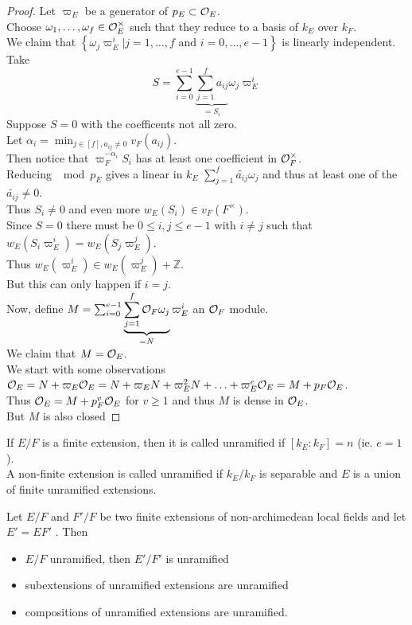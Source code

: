 \documentclass[../main.tex]{subfiles}
\begin{document}
\begin{proof}
Let $\varpi_E$ be a generator of $p_E \subset \mathcal{O}_E$.\\
Choose $\omega_1,\ldots,\omega_f\in \mathcal{O}_E^{\times}$ such that they reduce to a basis of $k_E$ over $k_F$.\\
We claim that $ \left\{ \omega_j \varpi_E^{i}| j=1 ,\ldots, f \text{ and } i=0,\ldots,e-1 \right\} $ is linearly independent.\\
Take 
\[ 
S=\sum_{i=0}^{ e-1} \underbrace{\sum_{j=1}^{ f} a_{ij}}_{ = S_i} \omega_j \varpi_E^{i}
\]
Suppose $S=0$ with the coefficents not all zero.\\
Let $\alpha_i= \min_{j \in [ f] ,a_{ij} \neq 0} v_F(a_{ij} ) $.\\
Then notice that $\varpi_F^{-\alpha_i}S_i$ has at least one coefficient in $\mathcal{O}_F^{\times}$.\\
Reducing $\mod p_E$ gives a linear in $k_E$ $ \sum_{j=1}^{ f}\tilde{a_{ij} } \omega_j$ and thus at least one of the $\tilde{a_{ij} }\neq 0$.\\
Thus $S_i \neq 0$ and even more $w_E( S_i) \in v_F( F^{\times}) $.\\
Since $S=0$ there must be $ 0 \leq i,j \leq e-1$ with $i\neq j$ such that $w_E( S_i \varpi_E^{i}) = w_E( S_j \varpi_E^{j}) $.\\
Thus $w_E( \varpi_E^{i}) \in w_E( \varpi_E^{j}) + \mathbb{Z}$.\\
But this can only happen if $i=j$.\\
Now, define $M = \sum_{i=0}^{ e-1} \underbrace{ \sum_{j=1}^{ f}\mathcal{O}_F \omega_j }_{=N}	\varpi_E^{i}$ an $\mathcal{O}_F$ module.\\
We claim that $M= \mathcal{O}_E$.\\
We start with some observations
 $\mathcal{O}_E= N + \varpi_E \mathcal{O}_E= N + \varpi_E N + \varpi_E^{2}N + \ldots + \varpi_E^{e}\mathcal{O}_E = M + p_F \mathcal{O}_E$.\\
	Thus $\mathcal{O}_E= M + p_F^{v}\mathcal{O}_E$ for $v \geq 1$ and thus $M$ is dense in $\mathcal{O}_E$.\\
	But $M$ is also closed


\end{proof}
\begin{defn}
	If $E /F$ is a finite extension, then it is called unramified if $ [ k_E:k_F] =n$ (ie. $e=1$ ).\\
	A non-finite extension is called unramified if $k_E /k_F$ is separable and $E$ is a union of finite unramified extensions.
\end{defn}
\begin{propo}
Let $E /F$ and $F'/F$ be two finite extensions of non-archimedean local fields and let $E' = EF'$ . Then
\begin{itemize}
\item $E /F$ unramified, then $E' /F'$ is unramified
\item subextensions of unramified extensions are unramified
\item compositions of unramified extensions are unramified.
\end{itemize}
\end{propo}
\end{document}
